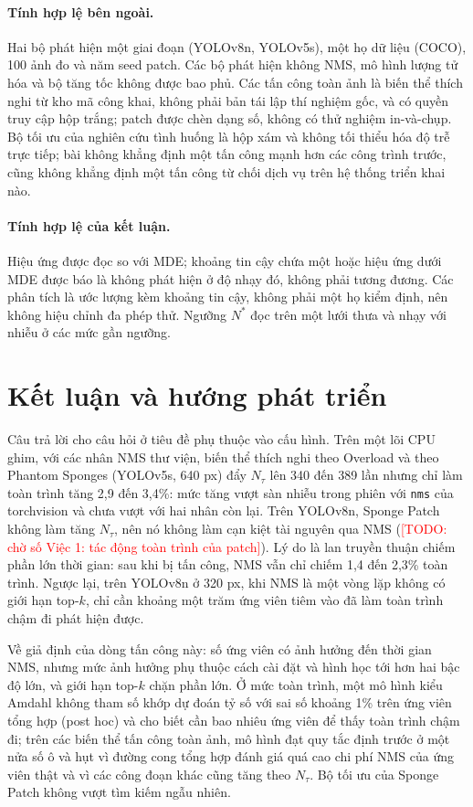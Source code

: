 \documentclass[a4paper,fleqn]{cas-dc}
\newcommand{\todo}[1]{\textcolor{red}{[TODO: #1]}}
\newcommand{\Ntau}{N_{\tau}}
\begin{document}
\paragraph{Tính hợp lệ bên ngoài.}
Hai bộ phát hiện một giai đoạn (YOLOv8n, YOLOv5s), một họ dữ liệu (COCO), 100 ảnh đo và năm seed patch. Các bộ phát hiện không NMS, mô hình lượng tử hóa và bộ tăng tốc không được bao phủ. Các tấn công toàn ảnh là biến thể thích nghi từ kho mã công khai, không phải bản tái lập thí nghiệm gốc, và có quyền truy cập hộp trắng; patch được chèn dạng số, không có thử nghiệm in-và-chụp. Bộ tối ưu của nghiên cứu tình huống là hộp xám và không tối thiểu hóa độ trễ trực tiếp; bài không khẳng định một tấn công mạnh hơn các công trình trước, cũng không khẳng định một tấn công từ chối dịch vụ trên hệ thống triển khai nào.
\paragraph{Tính hợp lệ của kết luận.}
Hiệu ứng được đọc so với MDE; khoảng tin cậy chứa một hoặc hiệu ứng dưới MDE được báo là không phát hiện ở độ nhạy đó, không phải tương đương. Các phân tích là ước lượng kèm khoảng tin cậy, không phải một họ kiểm định, nên không hiệu chỉnh đa phép thử. Ngưỡng $N^{*}$ đọc trên một lưới thưa và nhạy với nhiễu ở các mức gần ngưỡng.

\section{Kết luận và hướng phát triển}
\label{sec:conclusion}
Câu trả lời cho câu hỏi ở tiêu đề phụ thuộc vào cấu hình. Trên một lõi CPU ghim, với các nhân NMS thư viện, biến thể thích nghi theo Overload và theo Phantom Sponges (YOLOv5s, 640 px) đẩy $\Ntau$ lên 340 đến 389 lần nhưng chỉ làm toàn trình tăng 2,9 đến 3,4\%: mức tăng vượt sàn nhiễu trong phiên với \texttt{nms} của torchvision và chưa vượt với hai nhân còn lại. Trên YOLOv8n, Sponge Patch không làm tăng $\Ntau$, nên nó không làm cạn kiệt tài nguyên qua NMS (\todo{chờ số Việc 1: tác động toàn trình của patch}). Lý do là lan truyền thuận chiếm phần lớn thời gian: sau khi bị tấn công, NMS vẫn chỉ chiếm 1,4 đến 2,3\% toàn trình. Ngược lại, trên YOLOv8n ở 320 px, khi NMS là một vòng lặp không có giới hạn top-$k$, chỉ cần khoảng một trăm ứng viên tiêm vào đã làm toàn trình chậm đi phát hiện được.

Về giả định của dòng tấn công này: số ứng viên có ảnh hưởng đến thời gian NMS, nhưng mức ảnh hưởng phụ thuộc cách cài đặt và hình học tới hơn hai bậc độ lớn, và giới hạn top-$k$ chặn phần lớn. Ở mức toàn trình, một mô hình kiểu Amdahl không tham số khớp dự đoán tỷ số với sai số khoảng 1\% trên ứng viên tổng hợp (post hoc) và cho biết cần bao nhiêu ứng viên để thấy toàn trình chậm đi; trên các biến thể tấn công toàn ảnh, mô hình đạt quy tắc định trước ở một nửa số ô và hụt vì đường cong tổng hợp đánh giá quá cao chi phí NMS của ứng viên thật và vì các công đoạn khác cũng tăng theo $\Ntau$. Bộ tối ưu của Sponge Patch không vượt tìm kiếm ngẫu nhiên.
\end{document}
